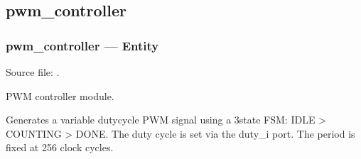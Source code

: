 \documentclass[letterpaper,10pt,english]{sphinxmanual}
\begin{document}
\sphinxstepscope


\subsection{pwm\_controller}
\label{\detokenize{modules/pwm_controller/index:pwm-controller}}\label{\detokenize{modules/pwm_controller/index::doc}}
\sphinxstepscope


\subsubsection{pwm\_controller — Entity}
\label{\detokenize{modules/pwm_controller/entity:pwm-controller-entity}}\label{\detokenize{modules/pwm_controller/entity::doc}}
\sphinxAtStartPar
Source file: .

\sphinxAtStartPar
PWM controller module.

\sphinxAtStartPar
Generates a variable duty\sphinxhyphen{}cycle PWM signal using a 3\sphinxhyphen{}state FSM:
IDLE \sphinxhyphen{}\textgreater{} COUNTING \sphinxhyphen{}\textgreater{} DONE. The duty cycle is set via the duty\_i port.
The period is fixed at 256 clock cycles.
\end{document}
